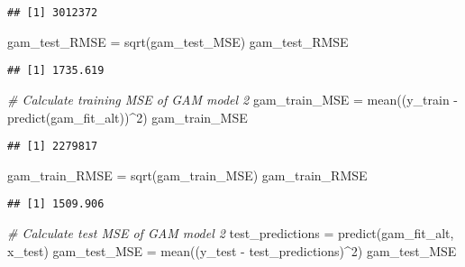 \documentclass[
]{article}
\newenvironment{Shaded}{\begin{snugshade}}{\end{snugshade}}
\newcommand{\CommentTok}[1]{\textcolor[rgb]{0.56,0.35,0.01}{\textit{#1}}}
\newcommand{\DecValTok}[1]{\textcolor[rgb]{0.00,0.00,0.81}{#1}}
\newcommand{\FunctionTok}[1]{\textcolor[rgb]{0.00,0.00,0.00}{#1}}
\newcommand{\NormalTok}[1]{#1}
\newcommand{\OtherTok}[1]{\textcolor[rgb]{0.56,0.35,0.01}{#1}}
\newcommand{\SpecialCharTok}[1]{\textcolor[rgb]{0.00,0.00,0.00}{#1}}
\begin{document}
\begin{verbatim}
## [1] 3012372
\end{verbatim}

\begin{Shaded}
\begin{Highlighting}[]
\NormalTok{gam\_test\_RMSE }\OtherTok{=} \FunctionTok{sqrt}\NormalTok{(gam\_test\_MSE)}
\NormalTok{gam\_test\_RMSE}
\end{Highlighting}
\end{Shaded}

\begin{verbatim}
## [1] 1735.619
\end{verbatim}

\begin{Shaded}
\begin{Highlighting}[]
\CommentTok{\# Calculate training MSE of GAM model 2}
\NormalTok{gam\_train\_MSE }\OtherTok{=} \FunctionTok{mean}\NormalTok{((y\_train }\SpecialCharTok{{-}} \FunctionTok{predict}\NormalTok{(gam\_fit\_alt))}\SpecialCharTok{\^{}}\DecValTok{2}\NormalTok{)}
\NormalTok{gam\_train\_MSE}
\end{Highlighting}
\end{Shaded}

\begin{verbatim}
## [1] 2279817
\end{verbatim}

\begin{Shaded}
\begin{Highlighting}[]
\NormalTok{gam\_train\_RMSE }\OtherTok{=} \FunctionTok{sqrt}\NormalTok{(gam\_train\_MSE)}
\NormalTok{gam\_train\_RMSE}
\end{Highlighting}
\end{Shaded}

\begin{verbatim}
## [1] 1509.906
\end{verbatim}

\begin{Shaded}
\begin{Highlighting}[]
\CommentTok{\# Calculate test MSE of GAM model 2}
\NormalTok{test\_predictions }\OtherTok{=} \FunctionTok{predict}\NormalTok{(gam\_fit\_alt, x\_test)}
\NormalTok{gam\_test\_MSE }\OtherTok{=} \FunctionTok{mean}\NormalTok{((y\_test }\SpecialCharTok{{-}}\NormalTok{ test\_predictions)}\SpecialCharTok{\^{}}\DecValTok{2}\NormalTok{)}
\NormalTok{gam\_test\_MSE}
\end{Highlighting}
\end{Shaded}
\end{document}
